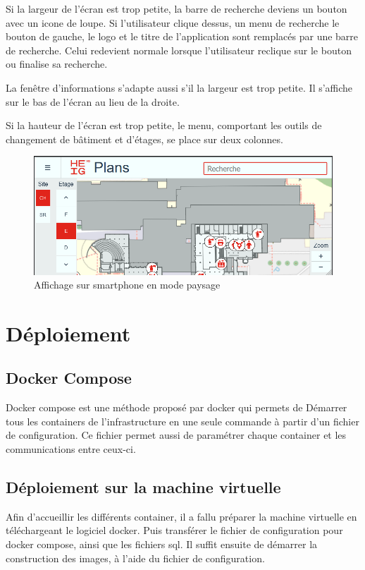 \documentclass[
    iai, %
    il, %
]{heig-tb}
\begin{document}
Si la largeur de l'écran est trop petite, la barre de recherche deviens un bouton avec un icone de loupe.
Si l'utilisateur clique dessus, un menu de recherche le bouton de gauche, le logo et le titre de l'application
sont remplacés par une barre de recherche.
Celui redevient normale lorsque l'utilisateur reclique sur le bouton ou finalise sa recherche.

La fenêtre d'informations s'adapte aussi s'il la largeur est trop petite.
Il s'affiche sur le bas de l'écran au lieu de la droite.

Si la hauteur de l'écran est trop petite, le menu, comportant les outils de changement de bâtiment et d'étages,
se place sur deux colonnes.

\begin{figure}[h]
    \centering
    \includegraphics[scale=0.5]{frontend-responsive-paysage.png}
    \caption{Affichage sur smartphone en mode paysage}
\end{figure}

\section{Déploiement}

\subsection{Docker Compose}
Docker compose est une méthode proposé par \gls{docker} qui permets de Démarrer tous les containers de l'infrastructure en une seule commande à partir d'un fichier de configuration.
Ce fichier permet aussi de paramétrer chaque container et les communications entre ceux-ci.

\subsection{Déploiement sur la machine virtuelle}
Afin d'accueillir les différents container, il a fallu préparer la machine virtuelle en téléchargeant le logiciel docker.
Puis transférer le fichier de configuration pour docker compose, ainsi que les fichiers sql.
Il suffit ensuite de démarrer la construction des images, à l'aide du fichier de configuration.
\end{document}
